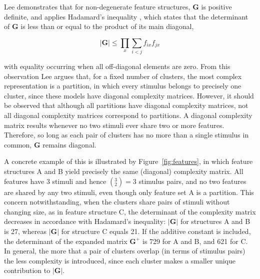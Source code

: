 \documentclass[doc,floatsintext]{apa6}
\newcommand{\mat}[1]{\mathbf{#1}}
\begin{document}
Lee demonstrates that for non-degenerate feature structures, $\mat{G}$ is positive definite, and applies Hadamard's inequality \cite[pp. 129-130]{bel70}, which states that the determinant of $\mat{G}$ is less than or equal to the product of its main diagonal,

\begin{displaymath}
\label{eq:hadamard}
|\mat{G}| \leq \prod_{x} \sum_{i<j} f_{ix} f_{jx}
\end{displaymath}

\noindent
with equality occurring when all off-diagonal elements are zero. From this observation Lee argues that, for a fixed number of clusters, the most complex representation is a partition, in which every stimulus belongs to precisely one cluster, since these models have diagonal complexity matrices. However, it should be observed that although all partitions have diagonal complexity matrices, not all diagonal complexity matrices correspond to partitions. A diagonal complexity matrix results whenever no two stimuli ever share two or more features. Therefore, so long as each pair of clusters has no more than a single stimulus in common, $\mat{G}$ remains diagonal.

A concrete example of this is illustrated by Figure~\ref{fig:features}, in which feature structures A and B yield precisely the same (diagonal) complexity matrix. All features have 3 stimuli and hence $(^{3}_{2})=3$ stimulus pairs, and no two features are shared by any two stimuli, even though only feature set A is a partition. This concern notwithstanding, when the clusters share pairs of stimuli without changing size, as in feature structure C, the determinant of the complexity matrix decreases in accordance with Hadamard's inequality: $|\mat{G}|$ for structures A and B is 27, whereas  $|\mat{G}|$ for structure C equals 21. If the additive constant is included, the determinant of the expanded matrix $\mat{G^{+}}$ is 729 for A and B, and 621 for C. In general, the more that a pair of clusters overlap (in terms of stimulus pairs) the less complexity is introduced, since each cluster makes a smaller unique contribution to $|\mat{G}|$.
\end{document}
